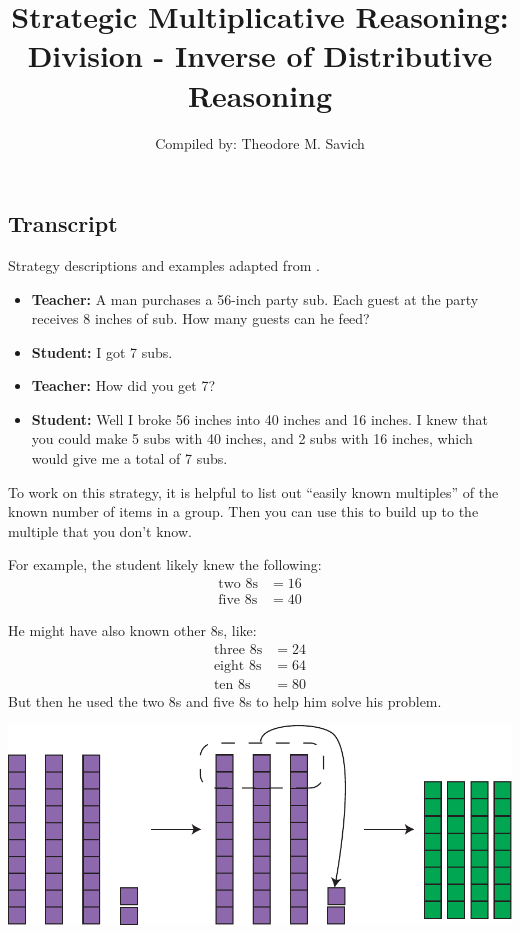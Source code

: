 \documentclass[11pt]{article}
\title{Strategic Multiplicative Reasoning: Division - Inverse of Distributive Reasoning}
\author{Compiled by: Theodore M. Savich}
\begin{document}
\maketitle
\subsection*{Transcript}
Strategy descriptions and examples adapted from \textcite{HackenbergCourseNotes}. 


\begin{itemize}
    \item \textbf{Teacher:} A man purchases a 56-inch party sub. Each guest at the party receives 8 inches of sub. How many guests can he feed?
  
\item \textbf{Student:} I got 7 subs.
  
\item \textbf{Teacher:} How did you get 7?
  
\item \textbf{Student:} Well I broke 56 inches into 40 inches and 16 inches. I knew that you could make 5 subs with 40 inches, and 2 subs with 16 inches, which would give me a total of 7 subs.
\end{itemize}

To work on this strategy, it is helpful to list out ``easily known
multiples'' of the known number of items in a group. Then you can use
this to build up to the multiple that you don't know.

For example, the student likely knew the following:
\begin{align*}
\text{two }8\text{s} &= 16\\
\text{five }8\text{s} &= 40
\end{align*}

\noindent He might have also known other 8s, like:
\begin{align*}
\text{three }8\text{s} &= 24\\
\text{eight }8\text{s} &= 64\\
\text{ten }8\text{s} &= 80
\end{align*}
But then he used the two 8s and five 8s to help him solve his problem.


\includegraphics[width=.8\textwidth]{images/Easy_Pictures/SMR_DIV_CGOB/PDF/SMR_DIV_CGOB.pdf}
\end{document}
